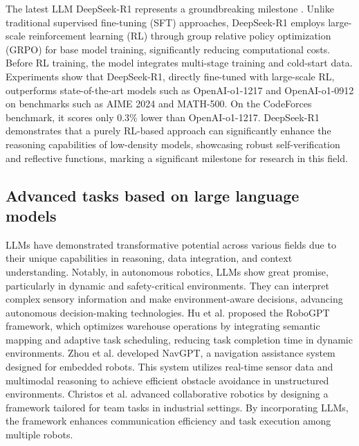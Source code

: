 The latest LLM DeepSeek-R1 represents a groundbreaking milestone \cite{deepseekai2025deepseekr1incentivizingreasoningcapability}. Unlike traditional supervised fine-tuning (SFT) \cite{wei2022finetuned} approaches, DeepSeek-R1 employs large-scale reinforcement learning (RL) through group relative policy optimization (GRPO) \cite{deepseek-math} for base model training, significantly reducing computational costs. Before RL training, the model integrates multi-stage training and cold-start data. Experiments show that DeepSeek-R1, directly fine-tuned with large-scale RL, outperforms state-of-the-art models such as OpenAI-o1-1217 and OpenAI-o1-0912 on benchmarks such as AIME 2024 and MATH-500. On the CodeForces benchmark, it scores only 0.3\% lower than OpenAI-o1-1217. DeepSeek-R1 demonstrates that a purely RL-based approach can significantly enhance the reasoning capabilities of low-density models, showcasing robust self-verification and reflective functions, marking a significant milestone for research in this field.

\subsection{Advanced tasks based on large language models}
LLMs have demonstrated transformative potential across various fields due to their unique capabilities in reasoning, data integration, and context understanding. Notably, in autonomous robotics, LLMs show great promise, particularly in dynamic and safety-critical environments. They can interpret complex sensory information and make environment-aware decisions, advancing autonomous decision-making technologies. Hu et al. \cite{chen2024robogpt} proposed the RoboGPT framework, which optimizes warehouse operations by integrating semantic mapping and adaptive task scheduling, reducing task completion time in dynamic environments. Zhou et al. \cite{10.1007/978-3-031-72667-5_15} developed NavGPT, a navigation assistance system designed for embedded robots. This system utilizes real-time sensor data and multimodal reasoning to achieve efficient obstacle avoidance in unstructured environments. Christos et al. \cite{GKOURNELOS20249} advanced collaborative robotics by designing a framework tailored for team tasks in industrial settings. By incorporating LLMs, the framework enhances communication efficiency and task execution among multiple robots.

